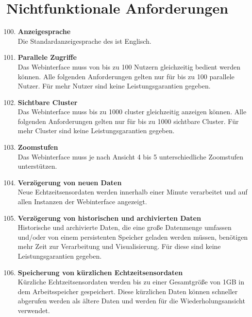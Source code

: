 \chapter{Nichtfunktionale Anforderungen}
\begin{enumerate}[label=\textbf{NF\arabic{enumi}0}]
	\setcounter{enumi}{99}
	
	\item \textbf{Anzeigesprache}\\
	Die Standardanzeigesprache des  ist Englisch.
	
	\item \textbf{Parallele Zugriffe}\\
	Das Webinterface muss von bis zu 100 Nutzern gleichzeitig bedient werden können. Alle folgenden Anforderungen gelten nur für bis zu 100 parallele Nutzer. Für mehr Nutzer sind keine Leistungsgarantien gegeben.
	
	\item \textbf{Sichtbare Cluster}\\
	Das Webinterface muss bis zu 1000 \gls{cluster} gleichzeitig anzeigen können. Alle folgenden Anforderungen gelten nur für bis zu 1000 sichtbare Cluster. Für mehr Cluster sind keine Leistungsgarantien gegeben.
	
	\item \textbf{Zoomstufen}\\
	Das Webinterface muss je nach Ansicht 4 bis 5 unterschiedliche Zoomstufen unterstützen.
	
	\item \textbf{Verzögerung von neuen Daten}\\
	Neue Echtzeitsensordaten werden innerhalb einer Minute verarbeitet und auf allen Instanzen der Webinterface angezeigt.
	
	\item \textbf{Verzögerung von historischen und archivierten Daten}\\
	Historische und archivierte Daten, die eine große Datenmenge umfassen und/oder von einem persistenten Speicher geladen werden müssen, benötigen mehr Zeit zur Verarbeitung und Visualisierung. Für diese sind keine Leistungsgarantien gegeben.
	
	\item \textbf{Speicherung von kürzlichen Echtzeitsensordaten}\\
	Kürzliche Echtzeitsensordaten werden bis zu einer Gesamtgröße von 1GB in dem Arbeitsspeicher gespeichert. Diese kürzlichen Daten können schneller abgerufen werden als ältere Daten und werden für die Wiederholungsansicht verwendet.
	

\end{enumerate}
